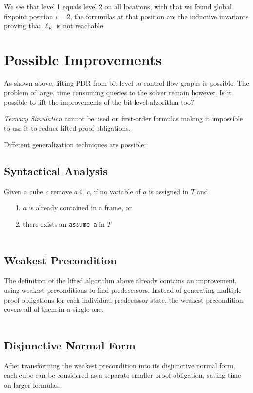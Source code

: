 \documentclass[11pt, a4paper, BCOR=10mm, ngerman, oneside]{scrbook}
\begin{document}
\hspace*{5cm}

We see that level 1 equals level 2 on all locations, with that we found global fixpoint position $i = 2$, the forumulas at that position are the inductive invariants proving that $\ell_E$ is not reachable.


\section{Possible Improvements}

As shown above, lifting PDR from bit-level to control flow graphs is possible. The problem of large, time consuming queries to the solver remain however. Is it possible to lift the improvements of the bit-level algorithm too? \par

\textsl{Ternary Simulation} cannot be used on first-order formulas making it impossible to use it to reduce lifted proof-obligations. \par
Different generalization techniques are possible:
\subsection{Syntactical Analysis}
Given a cube $c$ remove $a \subseteq c$, if no variable of $a$ is assigned in $T$ and
\begin{itemize}
\item[1.] $a$ is already contained in a frame, or
\item[2.] there exists an \texttt{assume a} in $T$ \\ \\
\end{itemize} 


\subsection{Weakest Precondition}
The definition of the lifted algorithm above already contains an improvement, using weakest preconditions to find predecessors. Instead of generating multiple proof-obligations for each individual predecessor state, the weakest precondition covers all of them in a single one. \\ \\


\subsection{Disjunctive Normal Form}
After transforming the weakest precondition into its disjunctive normal form, each cube can be considered as a separate smaller proof-obligation, saving time on larger formulas.\\ \\
\end{document}
